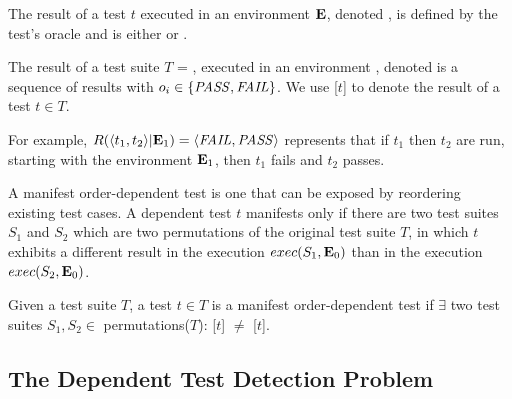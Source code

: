 \begin{definition}
The result of a test $t$ executed in an environment\/ $\mathbf{E}$,
denoted\/ , is defined by the test's oracle
and is either \pass or \fail.

The result of a test suite\/ $T$ = , executed in an
environment\/ \env, denoted\/  is a
sequence of results\/  with $o_i \in \{\mathit{PASS},\mathit{FAIL}\}$.
We use [$t$] to denote the result of a test $t \in T$.


For example, $R( \langle t_1, t_2 \rangle |\mathbf{E}_1) =  \langle \mathit{FAIL}, \mathit{PASS} \rangle $ represents that if
$t_1$ then $t_2$ are run, starting with the environment\/ $\mathbf{E}_1$, then\/
$t_1$ fails and\/ $t_2$ passes.
\end{definition}

A manifest order-dependent test is one that can be exposed by 
reordering existing test cases.
A dependent test $t$ manifests only
if there are two test suites $S_1$ and $S_2$ which
are two permutations of the original test suite $T$,
in which $t$ exhibits a different result
in the execution $exec(S_1,\mathbf{E}_0)$
than in the execution $exec(S_2,\mathbf{E}_0)$.

\begin{definition} \label{def:manifest}
Given a test suite\/ $T$, a test $t \in T$ is a
manifest order-dependent test if $\exists$ two test suites
$S_1, S_2 \in$ permutations($T$):
[$t$] $\neq$
[$t$].
%
\end{definition}




\subsection{The Dependent Test Detection Problem}

